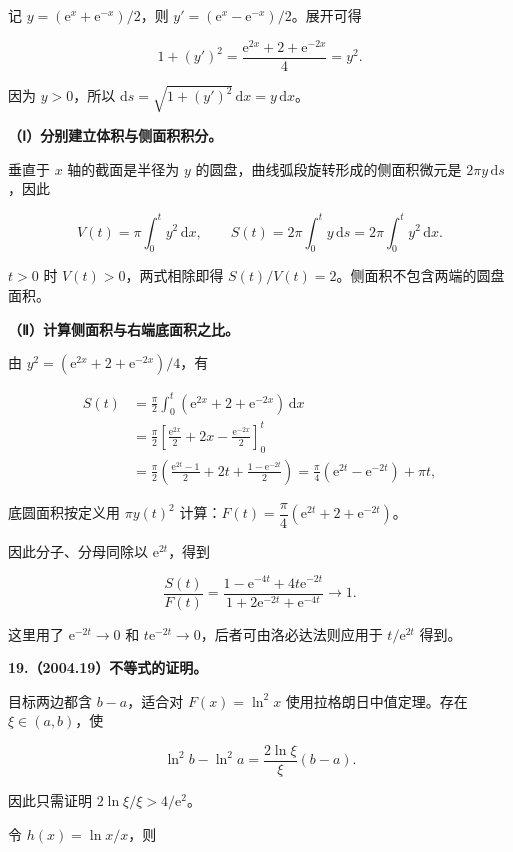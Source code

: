 \documentclass[UTF8,11pt,fontset=windows]{ctexart}
\begin{document}
记 $y=(\mathrm e^x+\mathrm e^{-x})/2$，则 $y'=(\mathrm e^x-\mathrm e^{-x})/2$。展开可得

$$
1+(y')^2=\frac{\mathrm e^{2x}+2+\mathrm e^{-2x}}4=y^2.
$$

因为 $y>0$，所以 $\mathrm ds=\sqrt{1+(y')^2}\,\mathrm dx=y\,\mathrm dx$。

\textbf{（Ⅰ）分别建立体积与侧面积积分。}

垂直于 $x$ 轴的截面是半径为 $y$ 的圆盘，曲线弧段旋转形成的侧面积微元是 $2\pi y\,\mathrm ds$，因此

$$
V(t)=\pi\int_0^t y^2\,\mathrm dx,
\qquad S(t)=2\pi\int_0^t y\,\mathrm ds=2\pi\int_0^t y^2\,\mathrm dx.
$$

$t>0$ 时 $V(t)>0$，两式相除即得 $\boxed{S(t)/V(t)=2}$。侧面积不包含两端的圆盘面积。

\textbf{（Ⅱ）计算侧面积与右端底面积之比。}

由 $y^2=(\mathrm e^{2x}+2+\mathrm e^{-2x})/4$，有

$$
\begin{aligned}
S(t)&=\frac\pi2\int_0^t(\mathrm e^{2x}+2+\mathrm e^{-2x})\,\mathrm dx\\
&=\frac\pi2\left[\frac{\mathrm e^{2x}}{2}+2x-\frac{\mathrm e^{-2x}}{2}\right]_0^t\\
&=\frac\pi2\left(\frac{\mathrm e^{2t}-1}{2}+2t+\frac{1-\mathrm e^{-2t}}{2}\right)
=\frac\pi4(\mathrm e^{2t}-\mathrm e^{-2t})+\pi t,
\end{aligned}
$$

底圆面积按定义用 $\pi y(t)^2$ 计算：$F(t)=\dfrac\pi4(\mathrm e^{2t}+2+\mathrm e^{-2t})$。

因此分子、分母同除以 $\mathrm e^{2t}$，得到

$$
\frac{S(t)}{F(t)}
=\frac{1-\mathrm e^{-4t}+4t\mathrm e^{-2t}}
 {1+2\mathrm e^{-2t}+\mathrm e^{-4t}}
\longrightarrow\boxed{1}.
$$

这里用了 $\mathrm e^{-2t}\to0$ 和 $t\mathrm e^{-2t}\to0$，后者可由洛必达法则应用于 $t/\mathrm e^{2t}$ 得到。

\clearpage

\textbf{19.（2004.19）不等式的证明。}

目标两边都含 $b-a$，适合对 $F(x)=\ln^2x$ 使用拉格朗日中值定理。存在 $\xi\in(a,b)$，使

$$
\ln^2b-\ln^2a=\frac{2\ln\xi}{\xi}(b-a).
$$

因此只需证明 $2\ln\xi/\xi>4/\mathrm e^2$。

令 $h(x)=\ln x/x$，则
\end{document}
